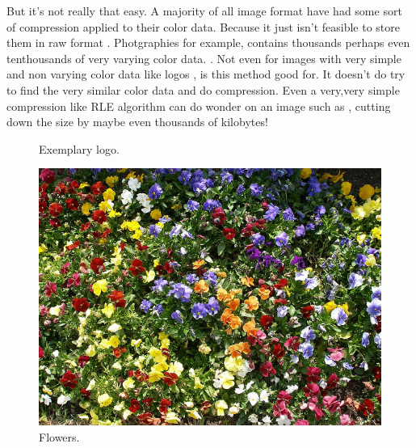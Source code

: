 \begin{refsection}
  But it's not really that easy. A majority of all image format have
  had some sort of compression applied to their color data. Because it
  just isn't feasible to store them in raw format . Photgraphies for example, contains thousands perhaps even
  tenthousands of very varying color data. . Not even for images with very simple
  and non varying color data like logos , is this
  method good for. It doesn't do try to find the very similar color
  data and do compression. Even a very,very simple compression like RLE
  algorithm can do wonder on an image such as ,
  cutting down the size by maybe even thousands of kilobytes!


  \begin{figure}[h!]
    \centering
    \newcommand{\shieldcolor}{red}
    \caption{Exemplary logo.}
    \label{fig:logo}
  \end{figure}

  \begin{figure}[h!]
    \centering
    \includegraphics[scale=0.4]{tikz_img/flowers.jpg}
    \caption{Flowers. \cite{turner06:_flower}}
    \label{fig:flowers}
  \end{figure}


  \printbibliography[heading=subbibliography]

\end{refsection}